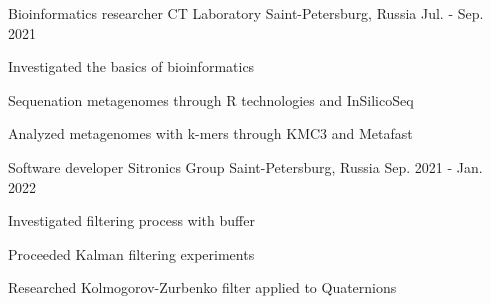 

\begin{cventries}

  \cventry
    {Bioinformatics researcher} %
    {CT Laboratory} %
    {Saint-Petersburg, Russia} %
    {Jul. - Sep. 2021} %
    {
      \begin{cvitems} %
        \item {Investigated the basics of bioinformatics}
        \item {Sequenation metagenomes through R technologies and InSilicoSeq}
        \item {Analyzed metagenomes with k-mers through KMC3 and Metafast}
      \end{cvitems}
    }

  \cventry
    {Software developer} %
    {Sitronics Group} %
    {Saint-Petersburg, Russia} %
    {Sep. 2021 - Jan. 2022} %
    {
      \begin{cvitems} %
        \item {Investigated filtering process with buffer}
        \item {Proceeded Kalman filtering experiments}
        \item {Researched Kolmogorov-Zurbenko filter applied to Quaternions}
      \end{cvitems}
    }

\end{cventries}
